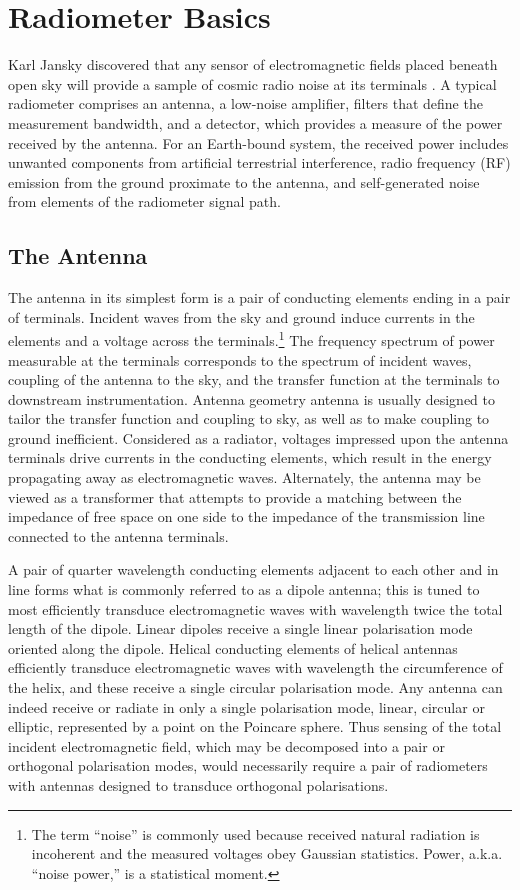 \section{Radiometer Basics}

Karl Jansky discovered that any sensor of electromagnetic fields placed beneath open sky will provide a sample of cosmic radio noise at its terminals \cite{jansky33}.  A typical radiometer comprises an antenna, a low-noise amplifier, filters that define the measurement bandwidth, and a detector, which provides a measure of the power received by the antenna. For an Earth-bound system, the received power includes unwanted components from artificial terrestrial interference, radio frequency (RF) emission from the ground proximate to the antenna, and self-generated noise from elements of the radiometer signal path. 

\subsection{The Antenna}
  
  The antenna in its simplest form is a pair of conducting elements ending in a pair of terminals.  Incident waves from the sky and ground induce currents in the elements and a voltage across the terminals.\footnote{The term ``noise'' is commonly used because received natural radiation is incoherent and the measured voltages obey Gaussian statistics.  Power, a.k.a. ``noise power,'' is a statistical moment.}  The frequency spectrum of power measurable at the terminals corresponds to the spectrum of incident waves,  coupling of the antenna to the sky, and the transfer function at the terminals to downstream instrumentation. 
  Antenna geometry antenna is usually designed to tailor the transfer function and coupling to sky, as well as to make  coupling to ground inefficient. Considered as a radiator, voltages impressed upon the antenna terminals drive currents in the conducting elements, which result in the energy propagating away as electromagnetic waves.  Alternately, the antenna may be viewed as a transformer that attempts to provide a matching between the impedance of free space on one side to the impedance of the transmission line connected to the antenna terminals.
  
  A pair of quarter wavelength conducting elements adjacent to each other and in line forms what is commonly referred to as a dipole antenna; this is tuned to most efficiently transduce electromagnetic waves with wavelength twice the total length of the dipole.  Linear dipoles receive a single linear polarisation mode oriented along the dipole.  Helical conducting elements of helical antennas efficiently transduce electromagnetic waves with wavelength the circumference of the helix, and these receive a single circular polarisation mode.  Any antenna can indeed receive or radiate in only a single polarisation mode, linear, circular or elliptic, represented by a point on the Poincare sphere.  Thus sensing of the total incident electromagnetic field, which may be decomposed into a pair or orthogonal polarisation modes, would necessarily require a pair of radiometers with antennas designed to transduce orthogonal polarisations.  
  
